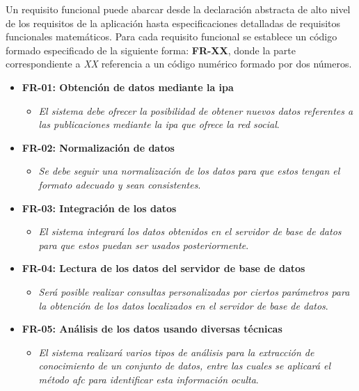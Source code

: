 \documentclass[../../main.tex]{subfiles}
\begin{document}
Un requisito funcional puede abarcar desde la declaración abstracta de alto nivel de los requisitos de la aplicación hasta especificaciones detalladas de requisitos funcionales matemáticos. Para cada requisito funcional se establece un código formado especificado de la siguiente forma: \textbf{FR-XX}, donde la parte correspondiente a \textit{XX} referencia a un código numérico formado por dos números.

\begin{itemize}
    \item \textbf{FR-01: Obtención de datos mediante la \gls{ipa} }
    \begin{itemize}
        \item \textit{El sistema debe ofrecer la posibilidad de obtener nuevos datos referentes a las publicaciones mediante la \gls{ipa} que ofrece la red social}.
    \end{itemize}
    \item \textbf{FR-02: Normalización de datos }
    \begin{itemize}
        \item \textit{Se debe seguir una normalización de los datos para que estos tengan el formato adecuado y sean consistentes}.
    \end{itemize}
    \item \textbf{FR-03: Integración de los datos }
    \begin{itemize}
        \item \textit{El sistema integrará los datos obtenidos en el servidor de base de datos para que estos puedan ser usados posteriormente}.
    \end{itemize}
    \item \textbf{FR-04: Lectura de los datos del servidor de base de datos }
    \begin{itemize}
        \item \textit{Será posible realizar consultas personalizadas por ciertos parámetros para la obtención de los datos localizados en el servidor de base de datos}.
    \end{itemize}
    \item \textbf{FR-05: Análisis de los datos usando diversas técnicas }
    \begin{itemize}
        \item \textit{El sistema realizará varios tipos de análisis para la extracción de conocimiento de un conjunto de datos, entre las cuales se aplicará el método \gls{afc} para identificar esta información oculta}.
    \end{itemize}

\end{itemize}
\end{document}
